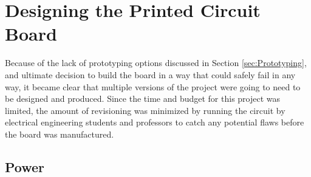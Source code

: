 \section{Designing the Printed Circuit Board}\label{sec:DesigningThePCB}

Because of the lack of prototyping options discussed in Section \ref{sec:Prototyping}, and ultimate decision to build the board in a way that could safely fail in any way, it became clear that multiple versions of the project were going to need to be designed and produced.
Since the time and budget for this project was limited, the amount of revisioning was minimized by running the circuit by electrical engineering students and professors to catch any potential flaws before the board was manufactured.

\subsection{Power}\label{subsec:DesigningPower}

